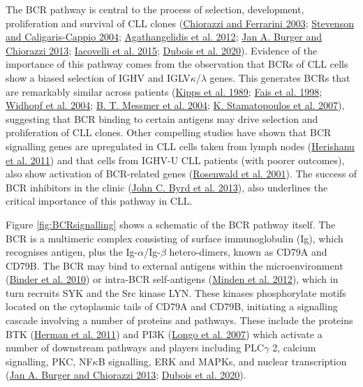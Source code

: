 \documentclass[11pt, a4paper, twosided]{book}
\begin{document}
The BCR pathway is central to the process of selection, development, proliferation and survival of CLL clones (\protect\hyperlink{ref-Chiorazzi2003}{Chiorazzi and Ferrarini 2003}; \protect\hyperlink{ref-Stevenson2004}{Stevenson and Caligaris-Cappio 2004}; \protect\hyperlink{ref-Agathangelidis2012}{Agathangelidis et al. 2012}; \protect\hyperlink{ref-Burger2013}{Jan A. Burger and Chiorazzi 2013}; \protect\hyperlink{ref-Iacovelli2015}{Iacovelli et al. 2015}; \protect\hyperlink{ref-Dubois2020}{Dubois et al. 2020}). Evidence of the importance of this pathway comes from the observation that BCRs of CLL cells show a biased selection of IGHV and IGLV\(\kappa\)/\(\lambda\) genes. This generates BCRs that are remarkably similar across patients (\protect\hyperlink{ref-Kipps1989}{Kipps et al. 1989}; \protect\hyperlink{ref-Fais1998}{Fais et al. 1998}; \protect\hyperlink{ref-Widhopf2004}{Widhopf et al. 2004}; \protect\hyperlink{ref-Messmer2004}{B. T. Messmer et al. 2004}; \protect\hyperlink{ref-Stamatopoulos2007}{K. Stamatopoulos et al. 2007}), suggesting that BCR binding to certain antigens may drive selection and proliferation of CLL clones. Other compelling studies have shown that BCR signalling genes are upregulated in CLL cells taken from lymph nodes (\protect\hyperlink{ref-Herishanu2011}{Herishanu et al. 2011}) and that cells from IGHV-U CLL patients (with poorer outcomes), also show activation of BCR-related genes (\protect\hyperlink{ref-Rosenwald2001}{Rosenwald et al. 2001}). The success of BCR inhibitors in the clinic (\protect\hyperlink{ref-Byrd2013}{John C. Byrd et al. 2013}), also underlines the critical importance of this pathway in CLL.

Figure \ref{fig:BCRsignalling} shows a schematic of the BCR pathway itself. The BCR is a multimeric complex consisting of surface immunoglobulin (Ig), which recognises antigen, plus the Ig-\(\alpha\)/Ig-\(\beta\) hetero-dimers, known as CD79A and CD79B. The BCR may bind to external antigens within the microenvironment (\protect\hyperlink{ref-Binder2010}{Binder et al. 2010}) or intra-BCR self-antigens (\protect\hyperlink{ref-Minden2012}{Minden et al. 2012}), which in turn recruits SYK and the Src kinase LYN. These kinases phosphorylate motifs located on the cytoplasmic tails of CD79A and CD79B, initiating a signalling cascade involving a number of proteins and pathways. These include the proteins BTK (\protect\hyperlink{ref-Herman2011}{Herman et al. 2011}) and PI3K (\protect\hyperlink{ref-Longo2007}{Longo et al. 2007}) which activate a number of downstream pathways and players including PLC\(\gamma\) 2, calcium signalling, PKC, NF\(\kappa\)B signalling, ERK and MAPKs, and nuclear transcription (\protect\hyperlink{ref-Burger2013}{Jan A. Burger and Chiorazzi 2013}; \protect\hyperlink{ref-Dubois2020}{Dubois et al. 2020}).
\end{document}

